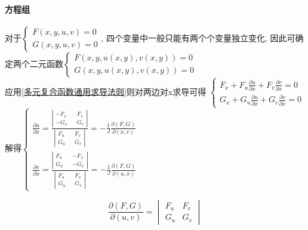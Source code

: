 \documentclass[main.tex]{subfiles}
\begin{document}
\paragraph{方程组}\label{方程组定义隐函数求导}
对于$\begin{cases}F(x, y, u, v) = 0 \\ G(x, y, u, v) = 0\end{cases}$,
四个变量中一般只能有两个个变量独立变化,
因此可确定两个二元函数$\begin{cases}F(x, y, u(x, y), v(x, y)) = 0 \\ G(x, y, u(x, y), v(x, y)) = 0\end{cases}$ \\
应用\eqref{多元复合函数通用求导法则}则对两边对x求导可得
$\begin{cases}F_x  + F_u \frac{\partial u}{\partial x} + F_v \frac{\partial v}{\partial x} = 0 \\ G_x  + G_u \frac{\partial u}{\partial x} + G_v \frac{\partial v}{\partial x} = 0\end{cases}$\\
解得$
    \begin{cases}
        \frac{\partial u}{\partial x} = \frac{\left|\begin{smallmatrix}-F_x && F_v \\ -G_x && G_v\end{smallmatrix}\right|}{\left|\begin{smallmatrix}F_u && F_v \\ G_u && G_v\end{smallmatrix}\right|} = -\frac{1}{J}\frac{\partial(F, G)}{\partial(x, v)} \\
        \frac{\partial v}{\partial x} = \frac{\left|\begin{smallmatrix}F_u && -F_x \\ G_u && -G_x\end{smallmatrix}\right|}{\left|\begin{smallmatrix}F_u && F_v \\ G_u && G_v\end{smallmatrix}\right|} = -\frac{1}{J}\frac{\partial(F, G)}{\partial(u, x)}
    \end{cases}
$
\begin{define*}[雅可比行列式]
    \begin{equation}
    \frac{\partial (F, G)}{\partial (u, v)} = \begin{vmatrix}F_u & F_v \\ G_u & G_v\end{vmatrix} \tag{雅可比行列式} \label{雅可比行列式}
    \end{equation}
\end{define*}
\end{document}
